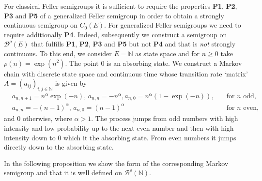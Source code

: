 \documentclass[a4paper,12pt]{article}
\theoremstyle{definition}
\theoremstyle{remark}
\numberwithin{equation}{section}
\numberwithin{theorem}{section}
\begin{document}
For classical Feller semigroups it is sufficient to require the properties \textbf{P1}, \textbf{P2}, \textbf{P3} and \textbf{P5} of a generalized Feller semigroup in order to obtain a strongly continuous semigroup on $C_0(E)$. For generalized Feller semigroups we need to require additionally  \textbf{P4}. 
Indeed, subsequently we construct a semigroup on $\mathscr{B}^{\rho}(E)$ that fulfills \textbf{P1}, \textbf{P2}, \textbf{P3} and \textbf{P5}  but not \textbf{P4} and that is \emph{not} strongly continuous. To this end, we consider $E = \mathbb{N}$ as state space
and for $n \geq 0$ take $\rho (n) = \exp (n^2)$. The point $0$ is an absorbing state.
We construct a Markov chain with discrete state space and continuous time whose transition rate `matrix' $A=(a_{ij})_{i,j \in \mathbb{N}} $ is given by
\begin{align*}
&a_{n,n + 1} =
n^\alpha \exp (- n), \, a_{n,n} = - n^\alpha, a_{n,0} = n^\alpha(1 - \exp (- n)), &\quad \text{for  $n$ odd,} \\
&a_{n,n} = - (n-1)^{\alpha}, \, a_{n,0} = (n-1)^{\alpha}  &\quad \text{for  $n$ even,}
\end{align*}
and
$0$ otherwise, where $\alpha > 1$. The process jumps from odd numbers with high
intensity and low probability up to the next even number and then with high
intensity down to $0$ which it the absorbing state. From even numbers it jumps directly down to the absorbing state. 

In the following proposition we show the form of the corresponding Markov semigroup and that it is well defined on $\mathscr{B}^{\rho}(\mathbb{N})$.
\end{document}
